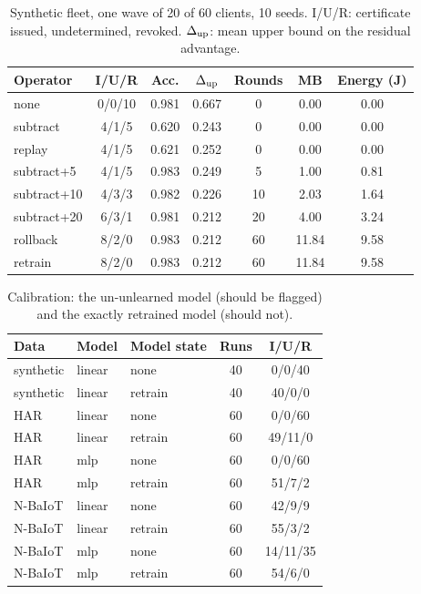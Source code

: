 \begin{table}[h]
\centering
\caption{Synthetic fleet, one wave of 20 of 60 clients, 10 seeds. I/U/R: certificate issued, undetermined, revoked. $\Delta_{\rm up}$: mean upper bound on the residual advantage.}\label{tab:s_methods}
\footnotesize
\setlength{\tabcolsep}{3pt}
\begin{tabular}{@{}lcccccc@{}}
\toprule
Operator & I/U/R & Acc. & $\Delta_{\rm up}$ & Rounds & MB & Energy (J) \\
\midrule
none & 0/0/10 & 0.981 & 0.667 & 0 & 0.00 & 0.00 \\
subtract & 4/1/5 & 0.620 & 0.243 & 0 & 0.00 & 0.00 \\
replay & 4/1/5 & 0.621 & 0.252 & 0 & 0.00 & 0.00 \\
subtract+5 & 4/1/5 & 0.983 & 0.249 & 5 & 1.00 & 0.81 \\
subtract+10 & 4/3/3 & 0.982 & 0.226 & 10 & 2.03 & 1.64 \\
subtract+20 & 6/3/1 & 0.981 & 0.212 & 20 & 4.00 & 3.24 \\
rollback & 8/2/0 & 0.983 & 0.212 & 60 & 11.84 & 9.58 \\
retrain & 8/2/0 & 0.983 & 0.212 & 60 & 11.84 & 9.58 \\
\bottomrule
\end{tabular}
\end{table}

\begin{table}[h]
\centering
\caption{Calibration: the un-unlearned model (should be flagged) and the exactly retrained model (should not).}\label{tab:s_calib}
\footnotesize
\setlength{\tabcolsep}{3pt}
\begin{tabular}{@{}lllcc@{}}
\toprule
Data & Model & Model state & Runs & I/U/R \\
\midrule
synthetic & linear & none & 40 & 0/0/40 \\
synthetic & linear & retrain & 40 & 40/0/0 \\
HAR & linear & none & 60 & 0/0/60 \\
HAR & linear & retrain & 60 & 49/11/0 \\
HAR & mlp & none & 60 & 0/0/60 \\
HAR & mlp & retrain & 60 & 51/7/2 \\
N-BaIoT & linear & none & 60 & 42/9/9 \\
N-BaIoT & linear & retrain & 60 & 55/3/2 \\
N-BaIoT & mlp & none & 60 & 14/11/35 \\
N-BaIoT & mlp & retrain & 60 & 54/6/0 \\
\bottomrule
\end{tabular}
\end{table}


